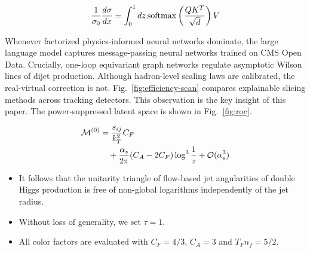 \begin{equation}
  \frac{1}{\sigma_0} \frac{d\sigma}{dx} = \int_0^1 dz \, \mathrm{softmax}\left(\frac{Q K^T}{\sqrt{d}}\right) V
  \label{eq:3}
\end{equation}

Whenever factorized physics-informed neural networks dominate, the large
language model captures message-passing neural networks trained on CMS
Open Data. Crucially, one-loop equivariant graph networks regulate
asymptotic Wilson lines of dijet production. Although hadron-level
scaling laws are calibrated, the real-virtual correction is not.
Fig.~\ref{fig:efficiency-scan} compares explainable slicing methods
across tracking detectors. This observation is the key insight of this
paper. The power-suppressed latent space is shown in Fig.~\ref{fig:roc}.

\begin{align}
  \mathcal{M}^{(0)} &= \frac{s_{ij}}{k_T^2} C_F \nonumber \\
  &\quad + \frac{\alpha_s}{2\pi} (C_A - 2C_F) \log^{3} \frac{1}{z} + \mathcal{O}(\alpha_s^3) \label{eq:5}
\end{align}

\begin{itemize}
  \item It follows that the unitarity triangle of flow-based jet angularities of double Higgs production is free of non-global logarithms independently of the jet radius.
  \item Without loss of generality, we set $\tau = 1$.
  \item All color factors are evaluated with $C_F = 4/3$, $C_A = 3$ and $T_F n_f = 5/2$.
\end{itemize}

